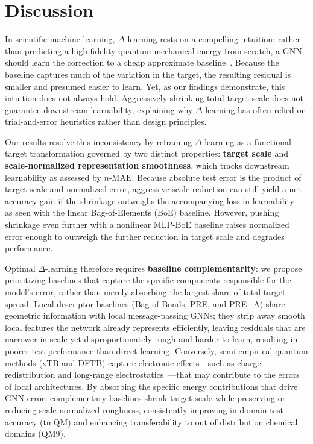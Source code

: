 \section{Discussion}
\label{sec:discussion}

In scientific machine learning, $\Delta$-learning rests on a compelling intuition: rather than predicting a high-fidelity quantum-mechanical energy from scratch, a GNN should learn the correction to a cheap approximate baseline~\cite{zheng2021aiqm1,zeng2023qdpi}. Because the baseline captures much of the variation in the target, the resulting residual is smaller and presumed easier to learn. Yet, as our findings demonstrate, this intuition does not always hold. Aggressively shrinking total target scale does not guarantee downstream learnability, explaining why $\Delta$-learning has often relied on trial-and-error heuristics rather than design principles.

Our results resolve this inconsistency by reframing $\Delta$-learning as a functional target transformation governed by two distinct properties: \textbf{target scale} and \textbf{scale-normalized representation smoothness}, which tracks downstream learnability as assessed by $n\text{-MAE}$. Because absolute test error is the product of target scale and normalized error, aggressive scale reduction can still yield a net accuracy gain if the shrinkage outweighs the accompanying loss in learnability—as seen with the linear Bag-of-Elements (BoE) baseline. However, pushing shrinkage even further with a nonlinear MLP-BoE baseline raises normalized error enough to outweigh the further reduction in target scale and degrades performance.

Optimal $\Delta$-learning therefore requires \textbf{baseline complementarity}: we propose prioritizing baselines that capture the specific components responsible for the model's error, rather than merely absorbing the largest share of total target spread. Local descriptor baselines (Bag-of-Bonds, PRE, and PRE+A) share geometric information with local message-passing GNNs; they strip away smooth local features the network already represents efficiently, leaving residuals that are narrower in scale yet disproportionately rough and harder to learn, resulting in poorer test performance than direct learning. Conversely, semi-empirical quantum methods (xTB and DFTB) capture electronic effects—such as charge redistribution and long-range electrostatics~\cite{wengert2022cocrystals,tu2026transferable}—that may contribute to the errors of local architectures. By absorbing the specific energy contributions that drive GNN error, complementary baselines shrink target scale while preserving or reducing scale-normalized roughness, consistently improving in-domain test accuracy (tmQM) and enhancing transferability to out of distribution chemical domains (QM9).

